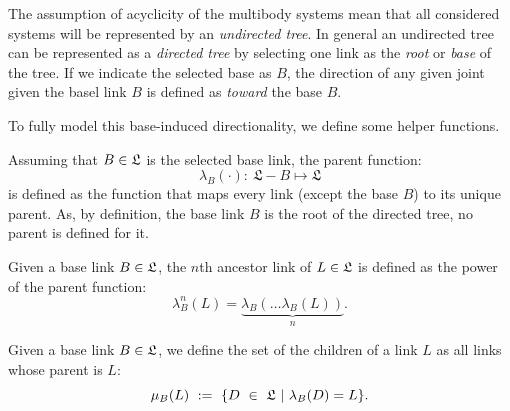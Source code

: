 

The assumption of acyclicity of the multibody systems mean that all considered systems will be represented by an \emph{undirected tree}. In general an undirected tree can be represented as a \emph{directed tree} by selecting one link as the \emph{root} or \emph{base} of the tree. If we indicate the selected base as $B$, the direction of any given joint given the basel link $B$ is defined as \emph{toward} the base $B$. 

To fully model this base-induced directionality, we define some helper functions. 

\begin{definition}
Assuming that $B \in \mathfrak{L}$ is the selected base link, the parent function:
\begin{equation}
    \lambda_B(\cdot) : \ \mathfrak{L} - B \mapsto \mathfrak{L} 
\end{equation}
is defined as the function that maps every link (except the base $B$) to its unique parent.
As, by definition, the base link $B$ is the root of the directed tree, no parent is defined for it.
\end{definition}

\begin{definition}
Given a base link $B \in \mathfrak{L}$, the $n$th ancestor link of $L \in \mathfrak{L}$ is defined as the power of the parent function:
\begin{equation}
    \lambda_B^n(L) = \underbrace{\lambda_B(\dots \lambda_B(L))}_n . 
\end{equation}
\end{definition}

\begin{definition}
Given a base link $B \in \mathfrak{L}$, we define the set of the children of a link $L$ as all links whose parent is $L$: 
\begin{equation}
    \mu_B(L) \ := \  \{ D \ \in \ \mathfrak{L} \ | \ \lambda_B(D) = L \}.
\end{equation}
\end{definition}

